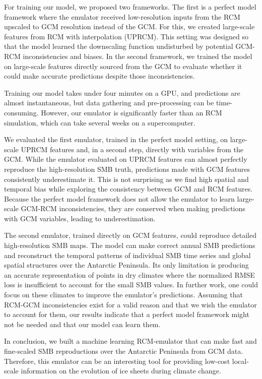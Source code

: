 \documentclass[a4paper,11pt,oneside]{report}
\begin{document}
For training our model, we proposed two frameworks. The first is a perfect model framework where the emulator received low-resolution inputs from the RCM upscaled to GCM resolution instead of the GCM. For this, we created large-scale features from RCM with interpolation (UPRCM). This setting was designed so that the model learned the downscaling function undisturbed by potential GCM-RCM inconsistencies and biases. In the second framework, we trained the model on large-scale features directly sourced from the GCM to evaluate whether it could make accurate predictions despite those inconsistencies. 

Training our model takes under four minutes on a GPU, and predictions are almost instantaneous, but data gathering and pre-processing can be time-consuming. However, our emulator is significantly faster than an RCM simulation, which can take several weeks on a supercomputer. 

We evaluated the first emulator, trained in the perfect model setting, on large-scale UPRCM features and, in a second step, directly with variables from the GCM. While the emulator evaluated on UPRCM features can almost perfectly reproduce the high-resolution SMB truth, predictions made with GCM features consistently underestimate it. This is not surprising as we find high spatial and temporal bias while exploring the consistency between GCM and RCM features. Because the perfect model framework does not allow the emulator to learn large-scale GCM-RCM inconsistencies, they are conserved when making predictions with GCM variables, leading to underestimation. 

The second emulator, trained directly on GCM features, could reproduce detailed high-resolution SMB maps. The model can make correct annual SMB predictions and reconstruct the temporal patterns of individual SMB time series and global spatial structures over the Antarctic Peninsula. Its only limitation is producing an accurate representation of points in dry climates where the normalized RMSE loss is insufficient to account for the small SMB values. In further work, one could focus on these climates to improve the emulator's predictions. Assuming that RCM-GCM inconsistencies exist for a valid reason and that we wish the emulator to account for them, our results indicate that a perfect model framework might not be needed and that our model can learn them.  


In conclusion, we built a machine learning RCM-emulator that can make fast and fine-scaled SMB reproductions over the Antarctic Peninsula from GCM data. Therefore, this emulator can be an interesting tool for providing low-cost local-scale information on the evolution of ice sheets during climate change.
\end{document}
